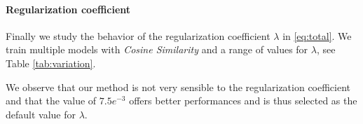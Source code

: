\paragraph{Regularization coefficient}
Finally we study the behavior of the regularization coefficient $\lambda$ in \ref{eq:total}. We 
train multiple models with \textit{Cosine Similarity} and a range of values for $\lambda$, see Table 
\ref{tab:variation}.

We observe that our method is not very sensible to the regularization coefficient and that the 
value of $7.5e^{-3}$ offers better performances and is thus selected as the default value for 
$\lambda$.

